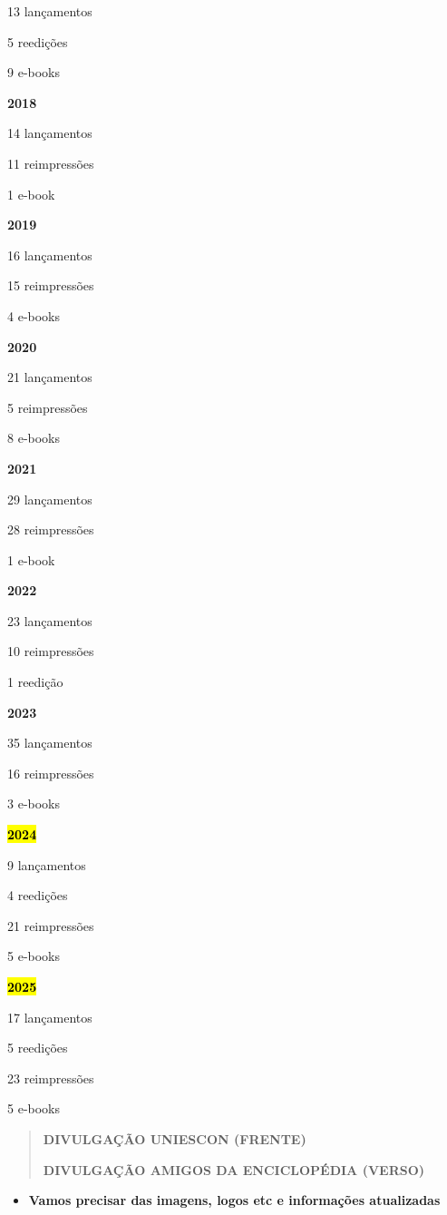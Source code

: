 \documentclass[
]{article}
\begin{document}
13 lançamentos

5 reedições

9 e-books

\textbf{2018}

14 lançamentos

11 reimpressões

1 e-book

\textbf{2019}

16 lançamentos

15 reimpressões

4 e-books

\textbf{2020}

21 lançamentos

5 reimpressões

8 e-books

\textbf{2021}

29 lançamentos

28 reimpressões

1 e-book

\textbf{2022}

23 lançamentos

10 reimpressões

1 reedição

\textbf{2023}

35 lançamentos

16 reimpressões

3 e-books

\textbf{\hl{2024}}

9 lançamentos

4 reedições

21 reimpressões

5 e-books

\textbf{\hl{2025}}

17 lançamentos

5 reedições

23 reimpressões

5 e-books

\begin{quote}
\textbf{DIVULGAÇÃO UNIESCON (FRENTE)}

\textbf{DIVULGAÇÃO AMIGOS DA ENCICLOPÉDIA (VERSO)}
\end{quote}

\begin{itemize}
\item
  \textbf{Vamos precisar das imagens, logos etc e informações atualizadas}
\end{itemize}
\end{document}

